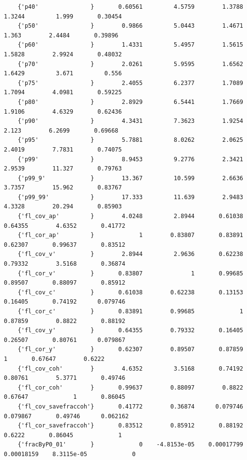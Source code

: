 \documentclass[
]{book}
\begin{document}
\begin{verbatim}
    {'p40'               }       0.60561         4.5759        1.3788        1.3244         1.999       0.30454 
    {'p50'               }        0.9866         5.0443        1.4671         1.363        2.4484       0.39896 
    {'p60'               }        1.4331         5.4957        1.5615        1.5828        2.9924       0.48032 
    {'p70'               }        2.0261         5.9595        1.6562        1.6429         3.671         0.556 
    {'p75'               }        2.4055         6.2377        1.7089        1.7094        4.0981       0.59225 
    {'p80'               }        2.8929         6.5441        1.7669        1.9106        4.6329       0.62436 
    {'p90'               }        4.3431         7.3623        1.9254         2.123        6.2699       0.69668 
    {'p95'               }        5.7881         8.0262        2.0625        2.4019        7.7831       0.74075 
    {'p99'               }        8.9453         9.2776        2.3421        2.9539        11.327       0.79763 
    {'p99_9'             }        13.367         10.599        2.6636        3.7357        15.962       0.83767 
    {'p99_99'            }        17.333         11.639        2.9483        4.3328        20.294       0.85903 
    {'fl_cov_ap'         }        4.0248         2.8944       0.61038       0.64355        4.6352       0.41772 
    {'fl_cor_ap'         }             1        0.83807       0.83891       0.62307       0.99637       0.83512 
    {'fl_cov_v'          }        2.8944         2.9636       0.62238       0.79332        3.5168       0.36874 
    {'fl_cor_v'          }       0.83807              1       0.99685       0.89507       0.88097       0.85912 
    {'fl_cov_c'          }       0.61038        0.62238       0.13153       0.16405       0.74192      0.079746 
    {'fl_cor_c'          }       0.83891        0.99685             1       0.87859        0.8822       0.88192 
    {'fl_cov_y'          }       0.64355        0.79332       0.16405       0.26507       0.80761      0.079867 
    {'fl_cor_y'          }       0.62307        0.89507       0.87859             1       0.67647        0.6222 
    {'fl_cov_coh'        }        4.6352         3.5168       0.74192       0.80761        5.3771       0.49746 
    {'fl_cor_coh'        }       0.99637        0.88097        0.8822       0.67647             1       0.86045 
    {'fl_cov_savefraccoh'}       0.41772        0.36874      0.079746      0.079867       0.49746      0.062162 
    {'fl_cor_savefraccoh'}       0.83512        0.85912       0.88192        0.6222       0.86045             1 
    {'fracByP0_01'       }             0    -4.8153e-05    0.00017799    0.00018159    8.3115e-05             0 

\end{verbatim}
\end{document}
